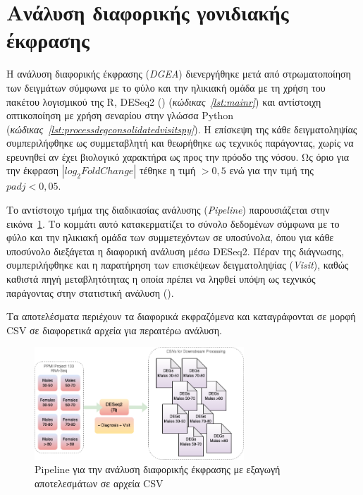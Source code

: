 \documentclass[12pt]{report}
\begin{document}
    \section{Ανάλυση διαφορικής γονιδιακής έκφρασης}
        \par
            Η ανάλυση διαφορικής έκφρασης (\emph{DGEA}) διενεργήθηκε μετά από στρωματοποίηση των δειγμάτων σύμφωνα με το φύλο και την ηλικιακή ομάδα με τη χρήση του πακέτου λογισμικού της R, DESeq2 (\emph{\cite{Love2014ModeratedDESeq2}}) (\emph{κώδικας~\ref{lst:mainr}}) και αντίστοιχη οπτικοποίηση με χρήση σεναρίου στην γλώσσα Python (\emph{κώδικας~\ref{lst:processdegconsolidatedvisitspy}}). Η επίσκεψη της κάθε δειγματοληψίας συμπεριλήφθηκε ως συμμεταβλητή και θεωρήθηκε ως τεχνικός παράγοντας, χωρίς να ερευνηθεί αν έχει βιολογικό χαρακτήρα ως προς την πρόοδο της νόσου. Ως όριο για την έκφραση $|log_2FoldChange|$ τέθηκε η τιμή $>0,5$ ενώ για την τιμή της $padj<0,05$.
        \par
            Το αντίστοιχο τμήμα της διαδικασίας ανάλυσης (\emph{Pipeline}) παρουσιάζεται στην εικόνα~\ref{fig:msci-big-pic-DEGs-blocks}. Το κομμάτι αυτό κατακερματίζει το σύνολο δεδομένων σύμφωνα με το φύλο και την ηλικιακή ομάδα των συμμετεχόντων σε υποσύνολα, όπου για κάθε υποσύνολο διεξάγεται η διαφορική ανάλυση μέσω DESeq2. Πέραν της διάγνωσης, συμπεριλήφθηκε και η παρατήρηση των επισκέψεων δειγματοληψίας (\emph{Visit}), καθώς καθιστά πηγή μεταβλητότητας η οποία πρέπει να ληφθεί υπόψη ως τεχνικός παράγοντας στην στατιστική ανάλυση (\emph{\cite{Love2016DifferentialPackage}}).
        \par
            Τα αποτελέσματα περιέχουν τα διαφορικά εκφραζόμενα και καταγράφονται σε μορφή CSV σε διαφορετικά αρχεία για περαιτέρω ανάλυση.
            \begin{figure}[h]
                \centering
                \includegraphics[width=0.7\textwidth]{Chapter-3/msci-big-pic-DEGs-blocks.png}
                \caption{Pipeline για την ανάλυση διαφορικής έκφρασης με εξαγωγή αποτελεσμάτων σε αρχεία CSV}
                \label{fig:msci-big-pic-DEGs-blocks}
            \end{figure}
\end{document}
